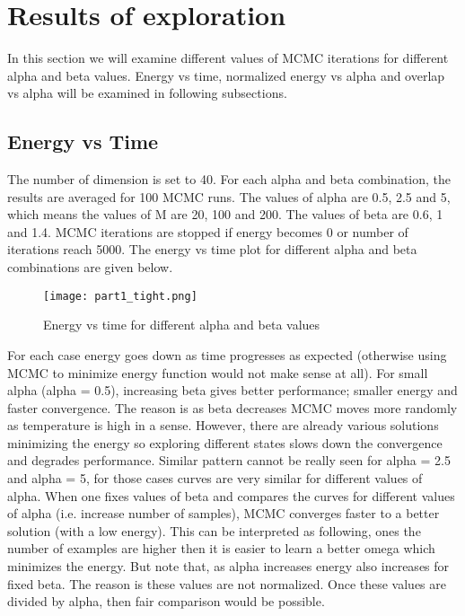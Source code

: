 \documentclass[a4paper]{article}
\begin{document}
\newpage
\section{Results of exploration}

In this section we will examine different values of MCMC iterations for different alpha and beta values. Energy vs time, normalized energy vs alpha and overlap vs alpha will be examined in following subsections.

\subsection{Energy vs Time}
The number of dimension is set to 40. For each alpha and beta combination, the results are averaged for 100 MCMC runs. The values of alpha are 0.5, 2.5 and 5, which means the values of M are 20, 100 and 200. The values of beta are 0.6, 1 and 1.4. MCMC iterations are stopped if energy becomes 0 or number of iterations reach 5000. The energy vs time plot for different alpha and beta combinations are given below.

\begin{figure}[H]
\centering
\texttt{[image: part1\_tight.png]}
\caption{\label{fig:part1}Energy vs time for different alpha and beta values}
\end{figure}

For each case energy goes down as time progresses as expected (otherwise using MCMC to minimize energy function would not make sense at all). For small alpha (alpha = 0.5), increasing beta gives better performance; smaller energy and faster convergence. The reason is as beta decreases MCMC moves more randomly as temperature is high in a sense. However, there are already various solutions minimizing the energy so exploring different states slows down the convergence and degrades performance. Similar pattern cannot be really seen for alpha = 2.5 and alpha = 5, for those cases curves are very similar for different values of alpha. When one fixes values of beta and compares the curves for different values of alpha (i.e. increase number of samples), MCMC converges faster to a better solution (with a low energy). This can be interpreted as following, ones the number of examples are higher then it is easier to learn a better omega which minimizes the energy. But note that, as alpha increases energy also increases for fixed beta. The reason is these values are not normalized. Once these values are divided by alpha, then fair comparison would be possible.
\end{document}
